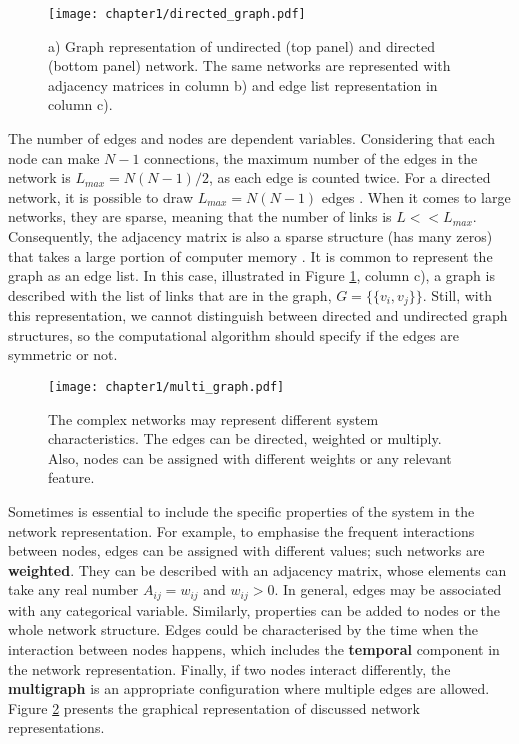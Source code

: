 \begin{figure}[h]
	\centering
	\texttt{[image: chapter1/directed\_graph.pdf]} 
	\caption[Graph, matrix and edge list representations.]{a) Graph representation of undirected (top panel) and directed (bottom panel) network. The same networks are represented with adjacency matrices in column b) and edge list representation in column c).}
	\label{fig:graph_dir}
\end{figure}

The number of edges and nodes are dependent variables. Considering that each node can make $N-1$ connections, the maximum number of the edges in the network is $L_{max}=N(N-1)/2$, as each edge is counted twice. For a directed network, it is possible to draw $L_{max}=N(N-1)$ edges \cite{caldarelli2007scalefree}. When it comes to large networks, they are sparse, meaning that the number of links is $L<<L_{max}$. Consequently, the adjacency matrix is also a sparse structure (has many zeros) that takes a large portion of computer memory \cite{barabasi2016network}. 
It is common to represent the graph as an edge list. In this case, illustrated in Figure \ref{fig:graph_dir}, column c), a graph is described with the list of links that are in the graph, $G = \{ \{v_i,v_j\}\}$. Still, with this representation, we cannot distinguish between directed and undirected graph structures, so the computational algorithm should specify if the edges are symmetric or not.  


\begin{figure}[h]
	\centering
	\texttt{[image: chapter1/multi\_graph.pdf]} 
	\caption[Different network representations.]{The complex networks may represent different system characteristics. The edges can be directed, weighted or multiply. Also, nodes can be assigned with different weights or any relevant feature.}
	\label{fig:multigraph}
\end{figure}

Sometimes is essential to include the specific properties of the system in the network representation. For example, to emphasise the frequent interactions between nodes, edges can be assigned with different values; such networks are \textbf{weighted}. They can be described with an adjacency matrix, whose elements can take any real number $A_{ij}=w_{ij}$ and $w_{ij}>0$. In general, edges may be associated with any categorical variable. Similarly, properties can be added to nodes or the whole network structure. Edges could be characterised by the time when the interaction between nodes happens, which includes the \textbf{temporal} component in the network representation. Finally, if two nodes interact differently, the \textbf{multigraph} is an appropriate configuration where multiple edges are allowed. Figure \ref{fig:multigraph} presents the graphical representation of discussed network representations.

